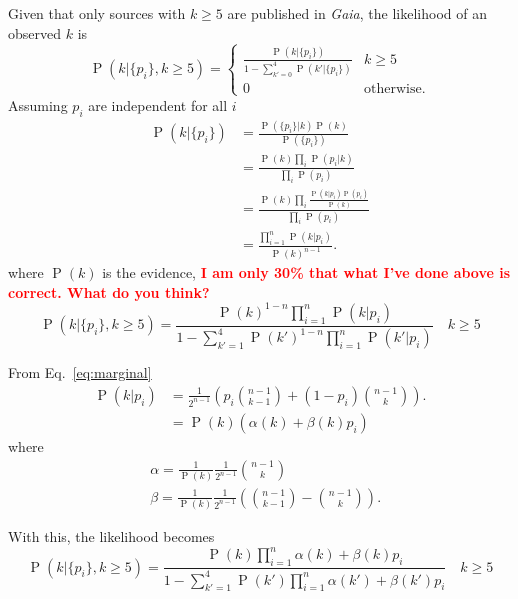 \documentclass[fleqn,usenatbib]{mnras}
\newcommand{\edits}[1]{{\bf \textcolor{red}{#1}}}
\newcommand{\gaia}{{\it Gaia}\xspace}
\begin{document}
Given that only sources with $k\geq 5$ are published in \gaia, the likelihood of an observed $k$ is
\begin{equation}
    \operatorname{P}(k|\{p_i\}, k\geq 5) = \begin{cases}
    \frac{\operatorname{P}(k|\{p_i\})}
    {1-\sum_{k'=0}^4\operatorname{P}(k'|\{p_i\})} & k\geq 5 \\
    0 & \mathrm{otherwise}.
    \end{cases}
\end{equation}
Assuming $p_i$ are independent for all $i$
\begin{align}
    \operatorname{P}(k|\{p_i\}) &= 
    \frac{\operatorname{P}(\{p_i\}|k)\operatorname{P}(k)}{\operatorname{P}(\{p_i\})} \\
    &= \frac{ \operatorname{P}(k)\prod_i\operatorname{P}(p_i|k)}{\prod_i\operatorname{P}(p_i)} \\
    &= \frac{\operatorname{P}(k)\prod_i \frac{\operatorname{P}(k|p_i)\operatorname{P}(p_i)}{\operatorname{P}(k)}}{\prod_i\operatorname{P}(p_i)} \\
     &= \frac{\prod_{i=1}^n\operatorname{P}(k|p_i)}{\operatorname{P}(k)^{n-1}}.
\end{align}
where $\operatorname{P}(k)$ is the evidence, \edits{I am only 30\% that what I've done above is correct. What do you think?}
\begin{equation}
    \operatorname{P}(k|\{p_i\}, k\geq 5) =
    \frac{\operatorname{P}(k)^{1-n}\prod_{i=1}^n \operatorname{P}(k|p_i)}
    {1-\sum_{k'=1}^4 \operatorname{P}(k')^{1-n}\prod_{i=1}^n\operatorname{P}(k'|p_i)} \quad k\geq 5
\end{equation}

From Eq.~\ref{eq:marginal}
\begin{align}
    \operatorname{P}(k|p_i) &= \frac{1}{2^{n-1}} \left( p_i \binom{n-1}{k-1} + (1-p_i)\binom{n-1}{k}\right).\\
    &= \operatorname{P}(k) (\alpha(k) + \beta(k) p_i)
\end{align}
where
\begin{align}
    &\alpha = \frac{1}{\operatorname{P}(k)}\frac{1}{2^{n-1}} \binom{n-1}{k} \\
    &\beta = \frac{1}{\operatorname{P}(k)}\frac{1}{2^{n-1}} \left(\binom{n-1}{k-1} - \binom{n-1}{k}\right).
\end{align}

With this, the likelihood becomes
\begin{equation}
    \operatorname{P}(k|\{p_i\}, k\geq 5) = 
    \frac{\operatorname{P}(k)\prod_{i=1}^n \alpha(k) + \beta(k)p_i}
    {1-\sum_{k'=1}^4 \operatorname{P}(k')\prod_{i=1}^n\alpha(k') + \beta(k')p_i} \quad k\geq 5
\end{equation}
\end{document}
